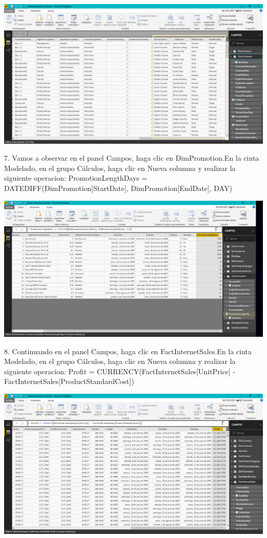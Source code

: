 \begin{center}
\includegraphics[width=15cm]{./Imagenes/Imagen6} 
\end{center}

\begin{itemize}
7. Vamos a observar en el panel Campos, haga clic en DimPromotion.En la cinta Modelado, en el grupo Cálculos, haga clic en Nueva columna y realizar la siguiente operacion:
PromotionLengthDays = DATEDIFF(DimPromotion[StartDate], DimPromotion[EndDate], DAY)


\end{itemize}

\begin{center}
\includegraphics[width=15cm]{./Imagenes/Imagen7} 
\end{center}


\begin{itemize}
8. Continuando en el panel Campos, haga clic en FactInternetSales.En la cinta Modelado, en el grupo Cálculos, haga clic en Nueva columna y realizar la siguiente operacion:
Profit = CURRENCY(FactInternetSales[UnitPrice] -
FactInternetSales[ProductStandardCost])
\end{itemize}

\begin{center}
\includegraphics[width=15cm]{./Imagenes/Imagen8} 
\end{center}
